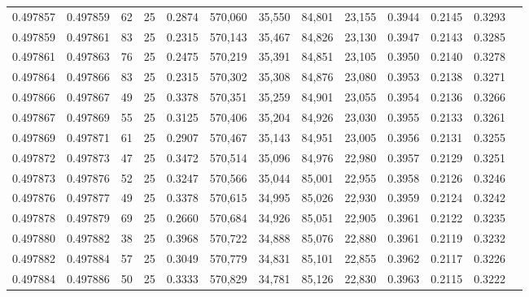 \begin{tabular}{rrrrrrrrrrrrr}
0.497857 & 0.497859 &    62 &  25 &                                     0.2874 & 570,060 &  35,550 &  84,801 &  23,155 & 0.3944 & 0.2145 & 0.3293 \\
0.497859 & 0.497861 &    83 &  25 &                                     0.2315 & 570,143 &  35,467 &  84,826 &  23,130 & 0.3947 & 0.2143 & 0.3285 \\
0.497861 & 0.497863 &    76 &  25 &                                     0.2475 & 570,219 &  35,391 &  84,851 &  23,105 & 0.3950 & 0.2140 & 0.3278 \\
0.497864 & 0.497866 &    83 &  25 &                                     0.2315 & 570,302 &  35,308 &  84,876 &  23,080 & 0.3953 & 0.2138 & 0.3271 \\
0.497866 & 0.497867 &    49 &  25 &                                     0.3378 & 570,351 &  35,259 &  84,901 &  23,055 & 0.3954 & 0.2136 & 0.3266 \\
0.497867 & 0.497869 &    55 &  25 &                                     0.3125 & 570,406 &  35,204 &  84,926 &  23,030 & 0.3955 & 0.2133 & 0.3261 \\
0.497869 & 0.497871 &    61 &  25 &                                     0.2907 & 570,467 &  35,143 &  84,951 &  23,005 & 0.3956 & 0.2131 & 0.3255 \\
0.497872 & 0.497873 &    47 &  25 &                                     0.3472 & 570,514 &  35,096 &  84,976 &  22,980 & 0.3957 & 0.2129 & 0.3251 \\
0.497873 & 0.497876 &    52 &  25 &                                     0.3247 & 570,566 &  35,044 &  85,001 &  22,955 & 0.3958 & 0.2126 & 0.3246 \\
0.497876 & 0.497877 &    49 &  25 &                                     0.3378 & 570,615 &  34,995 &  85,026 &  22,930 & 0.3959 & 0.2124 & 0.3242 \\
0.497878 & 0.497879 &    69 &  25 &                                     0.2660 & 570,684 &  34,926 &  85,051 &  22,905 & 0.3961 & 0.2122 & 0.3235 \\
0.497880 & 0.497882 &    38 &  25 &                                     0.3968 & 570,722 &  34,888 &  85,076 &  22,880 & 0.3961 & 0.2119 & 0.3232 \\
0.497882 & 0.497884 &    57 &  25 &                                     0.3049 & 570,779 &  34,831 &  85,101 &  22,855 & 0.3962 & 0.2117 & 0.3226 \\
0.497884 & 0.497886 &    50 &  25 &                                     0.3333 & 570,829 &  34,781 &  85,126 &  22,830 & 0.3963 & 0.2115 & 0.3222 \\

\end{tabular}
